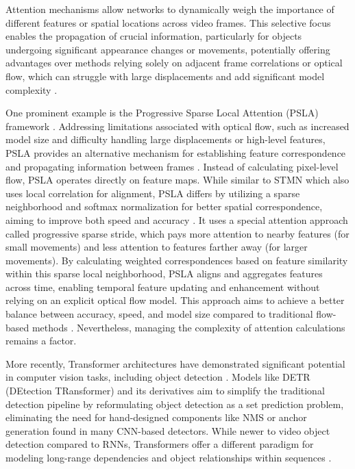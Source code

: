 Attention mechanisms allow networks to dynamically weigh the importance of different features or spatial locations across video frames. This selective focus enables the propagation of crucial information, particularly for objects undergoing significant appearance changes or movements, potentially offering advantages over methods relying solely on adjacent frame correlations or optical flow, which can struggle with large displacements and add significant model complexity \cite{jiaoNewGenerationDeep2022, guoProgressiveSparseLocal2019}.

One prominent example is the Progressive Sparse Local Attention (PSLA) framework \cite{guoProgressiveSparseLocal2019}. Addressing limitations associated with optical flow, such as increased model size and difficulty handling large displacements or high-level features, PSLA provides an alternative mechanism for establishing feature correspondence and propagating information between frames \cite{guoProgressiveSparseLocal2019}. Instead of calculating pixel-level flow, PSLA operates directly on feature maps. While similar to STMN \cite{xiaoVideoObjectDetection2018} which also uses local correlation for alignment, PSLA differs by utilizing a sparse neighborhood and softmax normalization for better spatial correspondence, aiming to improve both speed and accuracy \cite{guoProgressiveSparseLocal2019}. It uses a special attention approach called progressive sparse stride, which pays more attention to nearby features (for small movements) and less attention to features farther away (for larger movements). By calculating weighted correspondences based on feature similarity within this sparse local neighborhood, PSLA aligns and aggregates features across time, enabling temporal feature updating and enhancement without relying on an explicit optical flow model. This approach aims to achieve a better balance between accuracy, speed, and model size compared to traditional flow-based methods \cite{guoProgressiveSparseLocal2019}. Nevertheless, managing the complexity of attention calculations remains a factor.

More recently, Transformer architectures \cite{vaswaniAttentionAllYou2017} have demonstrated significant potential in computer vision tasks, including object detection \cite{carionEndToEndObjectDetection2020, zhuDeformableDETRDeformable2021}. Models like DETR (DEtection TRansformer) \cite{carionEndToEndObjectDetection2020, zhuDeformableDETRDeformable2021} and its derivatives aim to simplify the traditional detection pipeline by reformulating object detection as a set prediction problem, eliminating the need for hand-designed components like NMS or anchor generation found in many CNN-based detectors. While newer to video object detection compared to RNNs, Transformers offer a different paradigm for modeling long-range dependencies and object relationships within sequences \cite{wangEndtoEndVideoObject2021, shvetsTrackingObjectsAs2021}.

